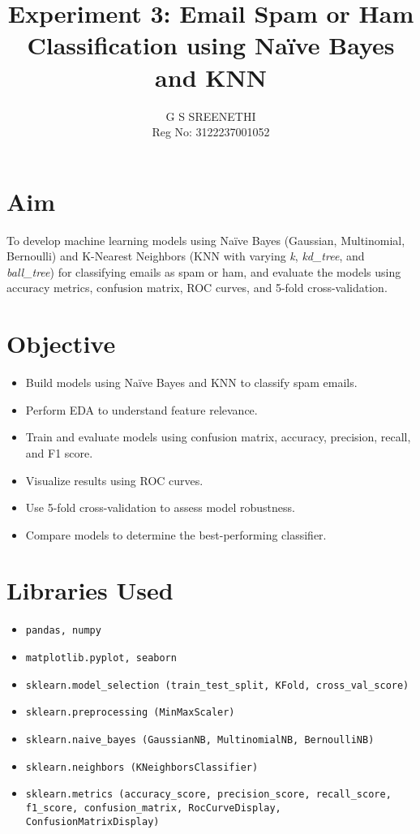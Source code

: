 \documentclass[12pt]{article}
\title{\textbf{Experiment 3: Email Spam or Ham Classification using Naïve Bayes and KNN}}
\author{G S SREENETHI \\ Reg No: 3122237001052}
\date{}
\begin{document}
\maketitle

\section*{Aim}
To develop machine learning models using Naïve Bayes (Gaussian, Multinomial, Bernoulli) and K-Nearest Neighbors (KNN with varying \textit{k}, \textit{kd\_tree}, and \textit{ball\_tree}) for classifying emails as spam or ham, and evaluate the models using accuracy metrics, confusion matrix, ROC curves, and 5-fold cross-validation.

\section*{Objective}
\begin{itemize}
    \item Build models using Naïve Bayes and KNN to classify spam emails.
    \item Perform EDA to understand feature relevance.
    \item Train and evaluate models using confusion matrix, accuracy, precision, recall, and F1 score.
    \item Visualize results using ROC curves.
    \item Use 5-fold cross-validation to assess model robustness.
    \item Compare models to determine the best-performing classifier.
\end{itemize}

\section*{Libraries Used}
\begin{itemize}
  \item \texttt{pandas, numpy}
  \item \texttt{matplotlib.pyplot, seaborn}
  \item \texttt{sklearn.model\_selection (train\_test\_split, KFold, cross\_val\_score)}
  \item \texttt{sklearn.preprocessing (MinMaxScaler)}
  \item \texttt{sklearn.naive\_bayes (GaussianNB, MultinomialNB, BernoulliNB)}
  \item \texttt{sklearn.neighbors (KNeighborsClassifier)}
  \item \texttt{sklearn.metrics (accuracy\_score, precision\_score, recall\_score, f1\_score, confusion\_matrix, RocCurveDisplay, ConfusionMatrixDisplay)}
\end{itemize}
\end{document}
